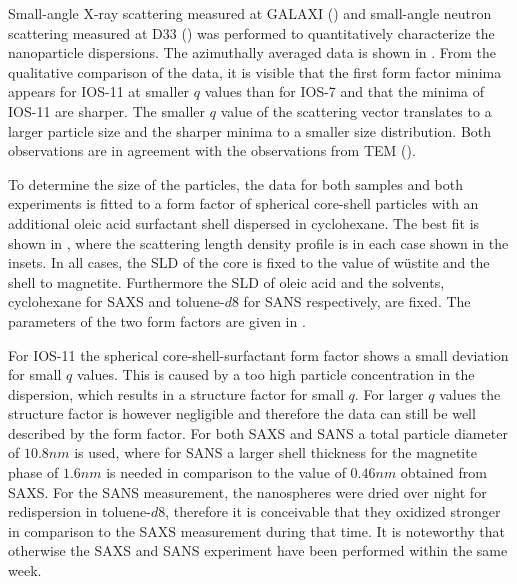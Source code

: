 \documentclass[\main/dresen_thesis.tex]{subfiles}
\begin{document}
  \label{sec:looselyPackedNS:nanoparticle:sas}
  Small-angle X-ray scattering measured at GALAXI () and small-angle neutron scattering measured at D33 () was performed to quantitatively characterize the nanoparticle dispersions.
  The azimuthally averaged data is shown in .
  From the qualitative comparison of the data, it is visible that the first form factor minima appears for IOS-11 at smaller $q$ values than for IOS-7 and that the minima of IOS-11 are sharper.
  The smaller $q$ value of the scattering vector translates to a larger particle size and the sharper minima to a smaller size distribution.
  Both observations are in agreement with the observations from TEM ().


    To determine the size of the particles, the data for both samples and both experiments is fitted to a form factor of spherical core-shell particles with an additional oleic acid surfactant shell dispersed in cyclohexane.
    The best fit is shown in , where the scattering length density profile is in each case shown in the insets.
    In all cases, the SLD of the core is fixed to the value of w\"ustite and the shell to magnetite.
    Furthermore the SLD of oleic acid and the solvents, cyclohexane for SAXS and toluene-$\mathit{d8}$ for SANS respectively, are fixed.
    The parameters of the two form factors are given in .

    For IOS-11 the spherical core-shell-surfactant form factor shows a small deviation for small $q$ values.
    This is caused by a too high particle concentration in the dispersion, which results in a structure factor for small $q$.
    For larger $q$ values the structure factor is however negligible and therefore the data can still be well described by the form factor.
    For both SAXS and SANS a total particle diameter of $10.8 \unit{nm}$ is used, where for SANS a larger shell thickness for the magnetite phase of $1.6 \unit{nm}$ is needed in comparison to the value of $0.46 \unit{nm}$ obtained from SAXS.
    For the SANS measurement, the nanospheres were dried over night for redispersion in toluene-$\mathit{d8}$, therefore it is conceivable that they oxidized stronger in comparison to the SAXS measurement during that time.
    It is noteworthy that otherwise the SAXS and SANS experiment have been performed within the same week.
\end{document}
